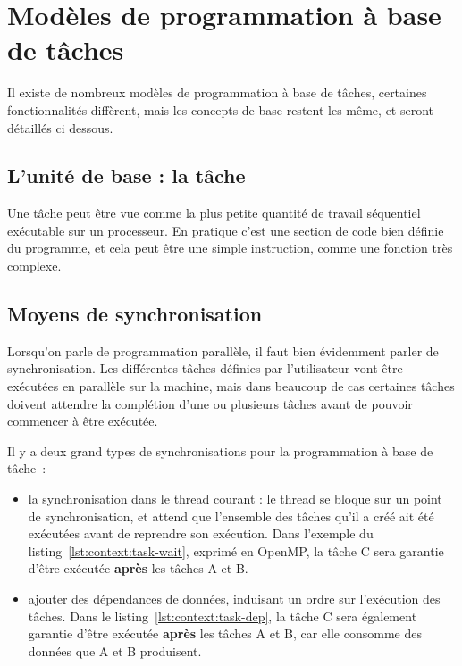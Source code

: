 \section{Modèles de programmation à base de tâches}\label{sec:context:others}

Il existe de nombreux modèles de programmation à base de tâches, certaines fonctionnalités diffèrent, mais les concepts de base restent les même, et seront détaillés ci dessous.

\subsection{L'unité de base : la tâche}

Une tâche peut être vue comme la plus petite quantité de travail séquentiel exécutable sur un processeur.
En pratique c'est une section de code bien définie du programme, et cela peut être une simple instruction, comme une fonction très complexe.

\subsection{Moyens de synchronisation}

Lorsqu'on parle de programmation parallèle, il faut bien évidemment parler de synchronisation.
Les différentes tâches définies par l'utilisateur vont être exécutées en parallèle sur la machine, mais dans beaucoup de cas certaines tâches doivent attendre la complétion d'une ou plusieurs tâches avant de pouvoir commencer à être exécutée.

Il y a deux grand types de synchronisations pour la programmation à base de tâche~:

\begin{itemize}
  \item la synchronisation dans le thread courant : le thread se bloque sur un point de synchronisation, et attend que l'ensemble des tâches qu'il a créé ait été exécutées avant de reprendre son exécution. Dans l'exemple du listing~\ref{lst:context:task-wait}, exprimé en OpenMP, la tâche C sera garantie d'être exécutée \textbf{après} les tâches A et B.
  \item ajouter des dépendances de données, induisant un ordre sur l'exécution des tâches. Dans le listing~\ref{lst:context:task-dep}, la tâche C sera également garantie d'être exécutée \textbf{après} les tâches A et B, car elle consomme des données que A et B produisent.
\end{itemize}

